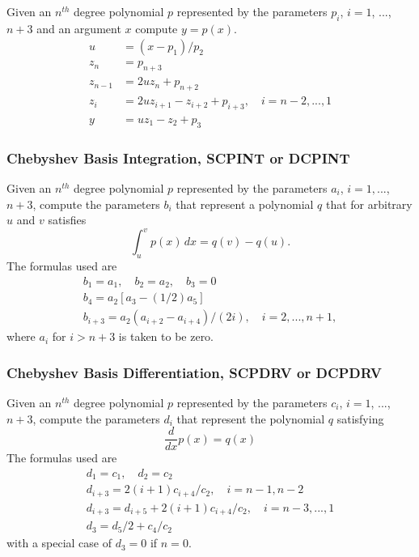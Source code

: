 \documentclass[twoside]{MATH77}
\begin{document}
Given an $n^{th}$ degree polynomial $p$ represented by the parameters $p_i$,
$i=1$, ..., $n+3$ and an argument $x$ compute $y=p(x).$%
\begin{align*}
u&=(x-p_1)/p_2\\
z_n&=p_{n+3}\\
z_{n-1}&=2uz_n+p_{n+2}\\
z_i&=2uz_{i+1}-z_{i+2}+p_{i+3},\quad i=n-2,...,1\\
y&=uz_1-z_2+p_3
\end{align*}
\subsubsection{Chebyshev Basis Integration, SCPINT or DCPINT}

Given an $n^{th}$ degree polynomial $p$ represented by the parameters $a_i$,
$i = 1, $..., $n+3$, compute the parameters $b_i$ that represent a
polynomial $q$ that for arbitrary $u$ and $v$ satisfies%
\begin{equation*}
\int_u^vp(x)\,dx=q(v)-q(u).
\end{equation*}
The formulas used are
\begin{gather*}
b_1=a_1,\quad b_2=a_2,\quad b_3=0\\
b_4=a_2\left[ a_3-(1/2)a_5\right]\\
b_{i+3}=a_2(a_{i+2}-a_{i+4})/(2i),\quad i=2,...,n+1,
\end{gather*}
where $a_i$ for $i>n+3$ is taken to be zero.

\subsubsection{Chebyshev Basis Differentiation, SCPDRV or DCPDRV}

Given an $n^{th}$ degree polynomial $p$ represented by the parameters $c_i$,
$i=1$, ..., $n+3$, compute the parameters $d_i$ that represent the
polynomial $q$ satisfying%
\begin{equation*}
\frac d{dx}p(x)=q(x)
\end{equation*}
The formulas used are%
\begin{gather*}
d_1=c_1,\quad d_2=c_2\\
d_{i+3}=2(i+1)c_{i+4}/c_2,\quad i=n-1,n-2\\
d_{i+3}=d_{i+5}+2(i+1)c_{i+4}/c_2,\quad i=n-3,...,1\\
d_3=d_5/2 + c_4 / c_2
\end{gather*}
with a special case of $d_3=0$ if $n=0.$
\end{document}

